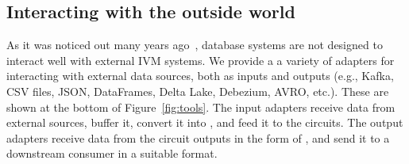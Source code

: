 \subsection{Interacting with the outside world}

As it was noticed out many years ago~\cite{labio-vldb00}, database
systems are not designed to interact well with external IVM systems.
We provide a a variety of adapters for interacting with external data
sources, both as inputs and outputs (e.g., Kafka, CSV files, JSON,
DataFrames, Delta Lake, Debezium, AVRO, etc.).  These are shown at the
bottom of Figure~\ref{fig:tools}.  The input adapters receive data
from external sources, buffer it, convert it into \zrs, and feed it to
the circuits.  The output adapters receive data from the circuit
outputs in the form of \zrs, and send it to a downstream consumer in a
suitable format.

